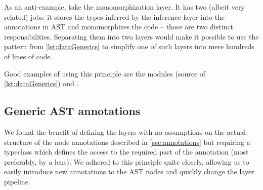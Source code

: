 As an anti-example, take the monomorphization layer. It has two (albeit very related) jobs: it stores the types inferred by the inference layer into the annotations in AST and monomorphizes the code -- those are two distinct responsibilities. Separating them into two layers would make it possible to use the pattern from \cref{lst:dataGenerics} to simplify one of such layers into mere hundreds of lines of code.

Good examples of using this principle are the modules  (source of \cref{lst:dataGenerics}) and .

\subsection{Generic AST annotations}

We found the benefit of defining the layers with no assumptions on the actual structure of the node annotations described in \cref{sec:annotations} but requiring a typeclass which defines the access to the required part of the annotation (most preferably, by a lens). We adhered to this principle quite closely, allowing us to easily introduce new annotations to the AST nodes and quickly change the layer pipeline.
